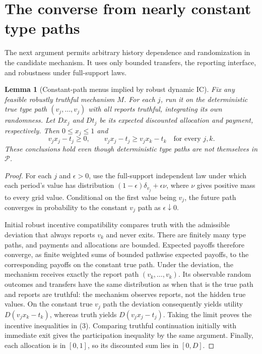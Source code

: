 \documentclass[11pt]{article}
\newtheorem{lemma}[theorem]{Lemma}
\theoremstyle{remark}\newtheorem{remark}[theorem]{Remark}
\begin{document}
\section*{The converse from nearly constant type paths}
The next argument permits arbitrary history dependence and randomization in the candidate mechanism. It uses only bounded transfers, the reporting interface, and robustness under full-support laws.

\begin{lemma}[Constant-path menus implied by robust dynamic IC]\label{lem:menu}
Fix any feasible robustly truthful mechanism $M$. For each $j$, run it on the deterministic true type path $(v_j,\ldots,v_j)$ with all reports truthful, integrating its own randomness. Let $Dx_j$ and $Dt_j$ be its expected discounted allocation and payment, respectively. Then $0\leq x_j\leq1$ and
\[
 v_jx_j-t_j\geq0,\qquad
 v_jx_j-t_j\geq v_jx_k-t_k\quad\text{for every }j,k.             \tag{3}
\]
These conclusions hold even though deterministic type paths are not themselves in $\mathcal P$.
\end{lemma}
\begin{proof}
For each $j$ and $\epsilon>0$, use the full-support independent law under which each period's value has distribution
$(1-\epsilon)\delta_{v_j}+\epsilon\nu$, where $\nu$ gives positive mass to every grid value. Conditional on the first value being $v_j$, the future path converges in probability to the constant $v_j$ path as $\epsilon\downarrow0$.

Initial robust incentive compatibility compares truth with the admissible deviation that always reports $v_k$ and never exits. There are finitely many type paths, and payments and allocations are bounded. Expected payoffs therefore converge, as finite weighted sums of bounded pathwise expected payoffs, to the corresponding payoffs on the constant true path. Under the deviation, the mechanism receives exactly the report path $(v_k,\ldots,v_k)$. Its observable random outcomes and transfers have the same distribution as when that is the true path and reports are truthful: the mechanism observes reports, not the hidden true values. On the constant true $v_j$ path the deviation consequently yields utility $D(v_jx_k-t_k)$, whereas truth yields $D(v_jx_j-t_j)$. Taking the limit proves the incentive inequalities in (3). Comparing truthful continuation initially with immediate exit gives the participation inequality by the same argument. Finally, each allocation is in $[0,1]$, so its discounted sum lies in $[0,D]$.
\end{proof}
\end{document}
